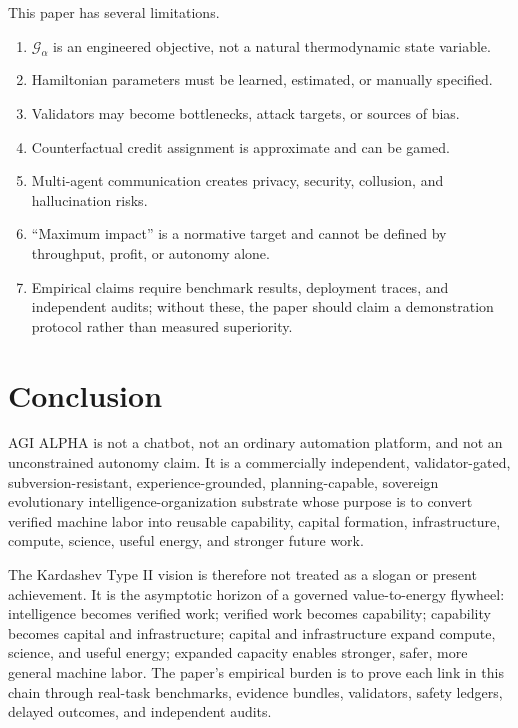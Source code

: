 \documentclass[11pt]{article}
\providecommand{\tightlist}{\setlength{\itemsep}{0pt}\setlength{\parskip}{0pt}}
\begin{document}
This paper has several limitations.

\begin{enumerate}
\def\labelenumi{\arabic{enumi}.}
\tightlist
\item
  \(\mathcal{G}_{\alpha}\) is an engineered objective, not a natural thermodynamic state variable.
\item
  Hamiltonian parameters must be learned, estimated, or manually specified.
\item
  Validators may become bottlenecks, attack targets, or sources of bias.
\item
  Counterfactual credit assignment is approximate and can be gamed.
\item
  Multi-agent communication creates privacy, security, collusion, and hallucination risks.
\item
  ``Maximum impact'' is a normative target and cannot be defined by throughput, profit, or autonomy alone.
\item
  Empirical claims require benchmark results, deployment traces, and independent audits; without these, the paper should claim a demonstration protocol rather than measured superiority.
\end{enumerate}

\section{Conclusion}\label{conclusion}

AGI ALPHA is not a chatbot, not an ordinary automation platform, and not an unconstrained autonomy claim. It is a commercially independent, validator-gated, subversion-resistant, experience-grounded, planning-capable, sovereign evolutionary intelligence-organization substrate whose purpose is to convert verified machine labor into reusable capability, capital formation, infrastructure, compute, science, useful energy, and stronger future work.

The Kardashev Type II vision is therefore not treated as a slogan or present achievement. It is the asymptotic horizon of a governed value-to-energy flywheel: intelligence becomes verified work; verified work becomes capability; capability becomes capital and infrastructure; capital and infrastructure expand compute, science, and useful energy; expanded capacity enables stronger, safer, more general machine labor. The paper's empirical burden is to prove each link in this chain through real-task benchmarks, evidence bundles, validators, safety ledgers, delayed outcomes, and independent audits.
\end{document}
